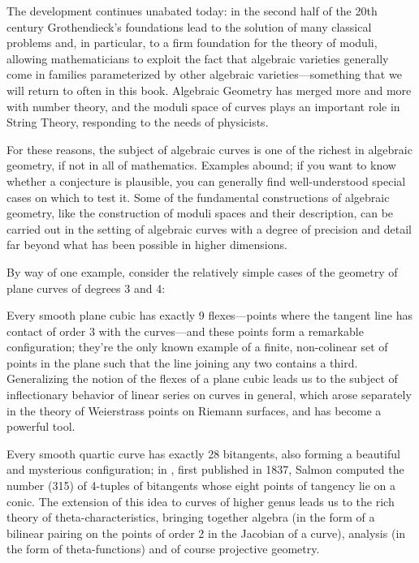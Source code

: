 The development continues unabated today: in the second half of the 20th century Grothendieck's foundations lead to the solution of many classical problems and, in particular, to a firm foundation for the theory of moduli, allowing mathematicians to exploit the fact that algebraic varieties generally come in families parameterized by other algebraic varieties---something that we will return to often in this book. Algebraic Geometry has merged more and more with number theory, and the moduli space of curves plays an important role in String Theory, responding to the needs of physicists.

For these reasons, the subject of algebraic curves is one of the richest in algebraic geometry, if not in all of mathematics. Examples abound; if you want to know whether a conjecture is plausible, you can generally find well-understood special cases on which to test it. Some of the fundamental constructions of algebraic geometry, like the construction of moduli spaces and their description, can be carried out in the setting of algebraic curves with a degree of precision and detail far beyond what has been possible in higher dimensions. 

By way of one example, consider the relatively simple cases of the geometry of plane curves of degrees 3 and 4: 

Every smooth plane cubic has exactly 9 flexes---points where the tangent line has contact of order 3 with the curves---and these points form a remarkable configuration; they're the only known example of a finite, non-colinear set of points in the plane such that the line joining any two contains a third. Generalizing the notion of the flexes of a plane cubic leads us to the subject of inflectionary behavior of linear series on curves in general, which arose separately in the theory of Weierstrass points on Riemann surfaces, and  has become a powerful tool. 

Every smooth quartic curve has exactly 28 bitangents, also forming a beautiful and mysterious configuration;  in \cite{MR0115124}, first published in 1837, Salmon computed the number (315) of 4-tuples of bitangents whose eight points of tangency lie on a conic. The extension of this idea to curves of higher genus leads us to the rich theory of theta-characteristics, bringing together algebra (in the form of a bilinear pairing on the points of order 2 in the Jacobian of a curve), analysis (in the form of theta-functions) and of course projective geometry.

